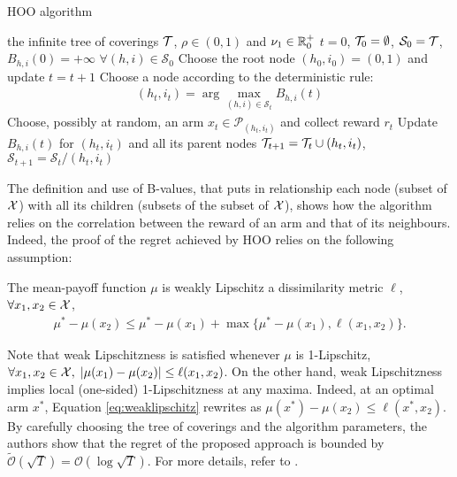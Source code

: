 \begin{algorithm}[t]
	\caption{\gls{HOO} algorithm}
	\label{alg:hoo}
	\begin{algorithmic}[1]
	 the infinite tree of coverings $\mathcal{T}$, $\rho\in(0,1)$ and $\nu_1\in\mathbb{R}^+_0$
	 $t=0$, $\mathcal{T}_0=\emptyset$, $\mathcal{S}_0=\mathcal{T}$, $B_{h,i}(0)=+\infty$ $\forall (h,i)\in\mathcal{S}_0$
	\State Choose the root node $(h_0, i_0)=(0,1)$ and update $t = t+1$
		\State Choose a node according to the deterministic rule:
		\begin{align}
		(h_t, i_t) = \arg\max_{(h, i)\in\mathcal{S}_t}B_{h,i}(t)
		\end{align}
		\State Choose, possibly at random, an arm $x_t\in\mathcal{P}_{(h_t, i_t)}$ and collect reward $r_t$
		\State Update $B_{h,i}(t)$ for $(h_t,i_t)$ and all its parent nodes
		\State $\mathcal{T}_{t+1}=\mathcal{T}_t\cup(h_t,i_t)$, $\mathcal{S}_{t+1}=\mathcal{S}_t/(h_t,i_t)$
	\EndFor
	\end{algorithmic}
\end{algorithm}

The definition and use of B-values, that puts in relationship each node (subset of $\mathcal{X}$) with all its children (subsets of the subset of $\mathcal{X}$), shows how the algorithm relies on the correlation between the reward of an arm and that of its neighbours. Indeed, the proof of the regret achieved by \gls{HOO} relies on the following assumption:

\begin{assumption}
The mean-payoff function $\mu$ is weakly Lipschitz \wrt a dissimilarity metric $\ell$, \ie $\forall x_1,x_2\in\mathcal{X}$,
\begin{align}
\mu^*-\mu(x_2)\leq\mu^* - \mu(x_1)+\max\{\mu^* - \mu(x_1), \ell(x_1,x_2)\}. \label{eq:weaklipschitz}
\end{align}
\end{assumption}

Note that weak Lipschitzness is satisfied whenever $\mu$ is 1-Lipschitz, \ie $\forall x_1,x_2\in\mathcal{X}, \; |\mu(x_1)-\mu(x_2)|\leq\ell(x_1,x_2)$. On the other hand, weak Lipschitzness implies local (one-sided) 1-Lipschitzness at any maxima. Indeed, at an optimal arm $x^*$, Equation \ref{eq:weaklipschitz} rewrites as $\mu(x^*)-\mu(x_2)\leq\ell(x^*,x_2)$. \\
By carefully choosing the tree of coverings and the algorithm parameters, the authors show that the regret of the proposed approach is bounded by $\widetilde{\mathcal{O}}(\sqrt{T}) = \mathcal{O}(\log\sqrt{T})$. For more details, refer to \cite{bubeck2011x}.


